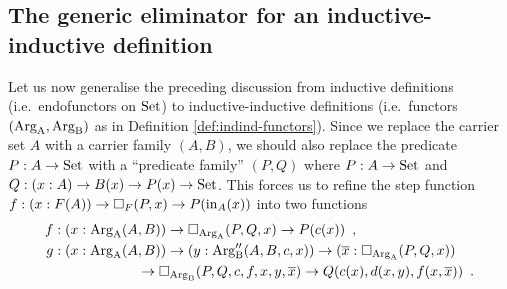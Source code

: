 \documentclass[orivec,envcountsame, ,envcountsect]{llncs}
\begin{document}
\subsection{The generic eliminator for an inductive-inductive definition}
\label{sec:elim-indind}

Let us now generalise the preceding discussion from inductive
definitions (i.e.\ endo\-functors on $\text{Set}$) to inductive-inductive
definitions (i.e.\ functors $(\text{Arg}_{\text{A}}, \text{Arg}_{\text{B}})$ as in Definition
\ref{def:indind-functors}). Since we replace the carrier set $A$ with
a carrier family $(A, B)$, we should also replace the predicate $P : A
\to \text{Set}$ with a ``predicate family'' $(P, Q)$ where $P : A \to \text{Set}$
and $Q : (x : A) \to B(x) \to P(x) \to \text{Set}$. This forces us to refine
the step function $f : (x : F(A)) \to \Box_F(P, x) \to P(\text{in}_A(x))$
into two functions
\begin{align*}
f &: (x : \text{Arg}_{\text{A}}(A, B)) \to \Box_{\text{Arg}_{\text{A}}}(P, Q, x) \to P(c(x)) \enspace ,\\
g &: (x : \text{Arg}_{\text{A}}(A, B)) \to (y : \text{Arg}_{\text{B}}''(A, B, c, x)) \to (\overline{x} : \Box_{\text{Arg}_{\text{A}}}(P, Q, x)) \\
& \qquad\qquad\qquad \to \Box_{\text{Arg}_{\text{B}}}(P, Q, c, f, x, y, \overline{x}) 
   \to Q(c(x), d(x, y), f(x, \overline{x})) \enspace .
\end{align*}

\end{document}
